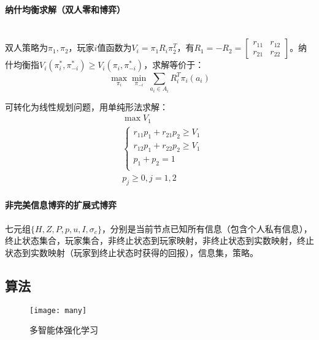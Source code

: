 \documentclass[
12pt, %
a4paper, 
oneside, %
headinclude,footinclude, %
]{scrartcl}
\begin{document}
\paragraph{纳什均衡求解（双人零和博弈）}~\\

双人策略为$ \pi_1, \pi_2 $，玩家$ i $值函数为$ V_i = \pi_1 R_i \pi_2^T $，有$ R_1 = -R_2 = \begin{bmatrix} r_{11} & r_{12} \\ r_{21} & r_{22} \end{bmatrix} $。纳什均衡指$ V_i(\pi_i^*, \pi_{-i}^*) \geq V_i(\pi_i, \pi_{-i}^*) $，求解等价于：
$$ \max_{\pi_i} \min_{\pi_{-i}} \sum_{a_i \in A_i} R_i^T \pi_i(a_i) $$

可转化为线性规划问题，用单纯形法求解：
\begin{align*}
&\max V_1 \\
&\begin{cases}
r_{11} p_1 + r_{21} p_2 \geq V_1 \\
r_{12} p_1 + r_{22} p_2 \geq V_1 \\
p_1 + p_2 = 1 \\
\end{cases} \\
&p_j \geq 0, j = 1, 2
\end{align*}
\paragraph{非完美信息博弈的扩展式博弈}
七元组$ \{H, Z, P, p, u, I ,\sigma_c\} $，分别是当前节点已知所有信息（包含个人私有信息），终止状态集合，玩家集合，非终止状态到玩家映射，非终止状态到实数映射，终止状态到实数映射（玩家到终止状态时获得的回报），信息集，策略。
\subsection[算法]{算法}
\begin{figure}[H]
\centering
\texttt{[image: many]}
\caption{多智能体强化学习}
\end{figure}
\end{document}
